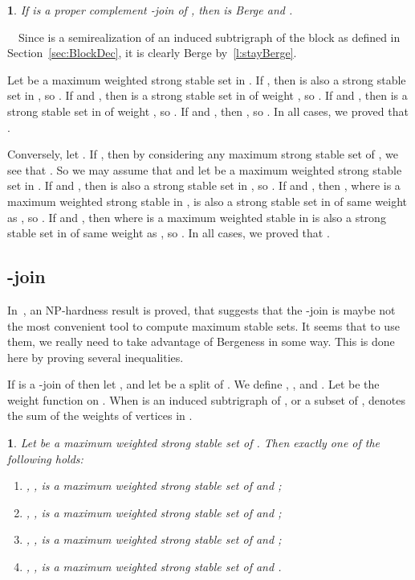 \documentclass[11 pt] {article}
\newcommand\blackslug{\hbox{\hskip 1pt \vrule width 4pt height 8pt depth 1.5pt
        \hskip 1pt}}
\newcommand\bbox{\hfill \quad \blackslug \medbreak}
\newtheorem{lemma}[theorem]{}
\newcounter{claim}
\newcommand{\Proof}{\setcounter{claim}{0}\noindent{\bf Proof.}\ \ }
\begin{document}
\begin{lemma}
  \label{alphaC2J}
  If  is a proper complement -join of , then 
  is Berge and .
\end{lemma}
\Proof Since  is a semirealization of an induced subtrigraph of
the block  as defined in Section~\ref{sec:BlockDec}, it is clearly
Berge by~\ref{l:stayBerge}.

Let  be a maximum weighted strong stable set in . If , then  is also a strong stable set in , so .  If  and , then  is a strong
stable set in  of weight , so .  If  and , then
 is a strong stable set in  of
weight , so .  If  and , then , so .
In all cases, we proved that .

Conversely, let .  If
, then by considering any maximum strong stable set
of , we see that .  So we
may assume that  and let  be a maximum
weighted strong stable set in .  If  and , then  is also a strong stable set in , so .  If  and , then , where  is a maximum weighted strong stable in
, is also a strong stable set in  of same weight as , so
.  If  and , then  where  is a maximum weighted stable in 
is also a strong stable set in  of same weight as , so .  In all cases, we proved that .  \bbox



\subsection{-join}
\label{ss:2j}

In~\cite{nicolas.kristina:2-join}, an NP-hardness result is proved,
that suggests that the -join is maybe not the most convenient tool to
compute maximum stable sets.  It seems that to use them, we really
need to take advantage of Bergeness in some way.  This is done here by
proving several inequalities.

If  is a -join of  then let ,  and let
      be a split of .
We define , ,  and .  Let  be the weight function on .  When 
is an induced subtrigraph of , or a subset of , 
denotes the sum of the weights of vertices in .


\begin{lemma}
  \label{l:4cases}
  Let  be a maximum weighted strong stable set of . Then exactly
  one of the following holds:

  \begin{enumerate}
  \item\label{i:4c1} , ,  is a maximum weighted strong stable set of  and ;
  \item\label{i:4c2} , ,  is a maximum weighted strong stable set of  and ;
  \item\label{i:4c3} , ,  is a maximum weighted strong stable set of
     and ;
  \item\label{i:4c4} , ,  is a maximum weighted strong stable set of
     and .
  \end{enumerate}
\end{lemma}
\end{document}
